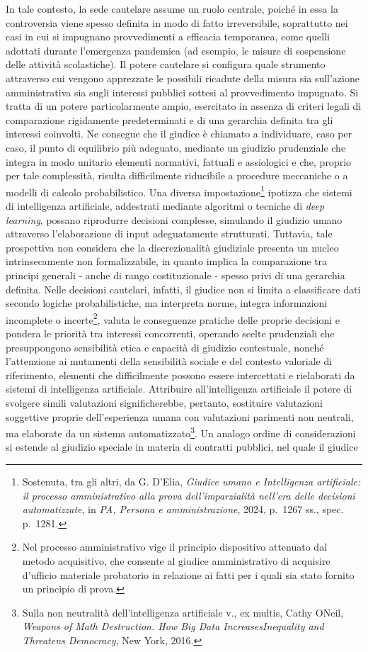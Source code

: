 \documentclass[american,a4paper,]{article}
\begin{document}
In tale contesto, la sede cautelare assume un ruolo centrale, poiché in essa la controversia viene spesso definita in modo di fatto irreversibile, soprattutto nei casi in cui si impugnano provvedimenti a efficacia temporanea, come quelli adottati durante l'emergenza pandemica (ad esempio, le misure di sospensione delle attività scolastiche). Il potere cautelare si configura quale strumento attraverso cui vengono apprezzate le possibili ricadute della misura sia sull'azione amministrativa sia sugli interessi pubblici sottesi al provvedimento impugnato. Si tratta di un potere particolarmente ampio, esercitato in assenza di criteri legali di comparazione rigidamente predeterminati e di una gerarchia definita tra gli interessi coinvolti. Ne consegue che il giudice è chiamato a individuare, caso per caso, il punto di equilibrio più adeguato, mediante un giudizio prudenziale che integra in modo unitario elementi normativi, fattuali e assiologici e che, proprio per tale complessità, risulta difficilmente riducibile a procedure meccaniche o a modelli di calcolo probabilistico. Una diversa impostazione\footnote{Sostenuta, tra gli altri, da G. D'Elia, \emph{Giudice umano e Intelligenza artificiale: il processo amministrativo alla prova dell'imparzialità nell'era delle decisioni automatizzate}, in \emph{PA, Persona e amministrazione}, 2024, p.~1267 ss., spec. p.~1281.} ipotizza che sistemi di intelligenza artificiale, addestrati mediante algoritmi o tecniche di \emph{deep learning}, possano riprodurre decisioni complesse, simulando il giudizio umano attraverso l'elaborazione di input adeguatamente strutturati. Tuttavia, tale prospettiva non considera che la discrezionalità giudiziale presenta un nucleo intrinsecamente non formalizzabile, in quanto implica la comparazione tra principi generali - anche di rango costituzionale - spesso privi di una gerarchia definita. Nelle decisioni cautelari, infatti, il giudice non si limita a classificare dati secondo logiche probabilistiche, ma interpreta norme, integra informazioni incomplete o incerte\footnote{Nel processo amministrativo vige il principio dispositivo attenuato dal metodo acquisitivo, che consente al giudice amministrativo di acquisire d'ufficio materiale probatorio in relazione ai fatti per i quali sia stato fornito un principio di prova.}, valuta le conseguenze pratiche delle proprie decisioni e pondera le priorità tra interessi concorrenti, operando scelte prudenziali che presuppongono sensibilità etica e capacità di giudizio contestuale, nonché l'attenzione ai mutamenti della sensibilità sociale e del contesto valoriale di riferimento, elementi che difficilmente possono essere intercettati e rielaborati da sistemi di intelligenza artificiale. Attribuire all'intelligenza artificiale il potere di svolgere simili valutazioni significherebbe, pertanto, sostituire valutazioni soggettive proprie dell'esperienza umana con valutazioni parimenti non neutrali, ma elaborate da un sistema automatizzato\footnote{Sulla non neutralità dell'intelligenza artificiale v., ex multis, Cathy O\textquotesingle Neil, \emph{Weapons of Math Destruction. How Big Data IncreasesInequality and Threatens Democracy}, New York, 2016.}. Un analogo ordine di considerazioni si estende al giudizio speciale in materia di contratti pubblici, nel quale il giudice 
\end{document}
